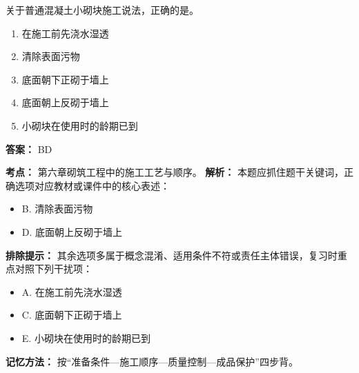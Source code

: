 \documentclass[UTF8,fontset=fandol,11pt]{ctexart}
\begin{document}
\begin{quizbox}[title={第 27 题}]
关于普通混凝土小砌块施工说法，正确的是。\\
\begin{enumerate}[label=\Alph*.]
\item 在施工前先浇水湿透
\item 清除表面污物
\item 底面朝下正砌于墙上
\item 底面朝上反砌于墙上
\item 小砌块在使用时的龄期已到
\end{enumerate}
\textbf{答案：} BD
\vspace{0.25em}
\begin{answerbox}[title={考点解析}]
\textbf{考点：} 第六章砌筑工程中的施工工艺与顺序。
\textbf{解析：} 本题应抓住题干关键词，正确选项对应教材或课件中的核心表述：
\begin{itemize}
\item B. 清除表面污物
\item D. 底面朝上反砌于墙上
\end{itemize}
\textbf{排除提示：} 其余选项多属于概念混淆、适用条件不符或责任主体错误，复习时重点对照下列干扰项：
\begin{itemize}
\item A. 在施工前先浇水湿透
\item C. 底面朝下正砌于墙上
\item E. 小砌块在使用时的龄期已到
\end{itemize}
\textbf{记忆方法：} 按“准备条件—施工顺序—质量控制—成品保护”四步背。
\end{answerbox}
\end{quizbox}
\end{document}
